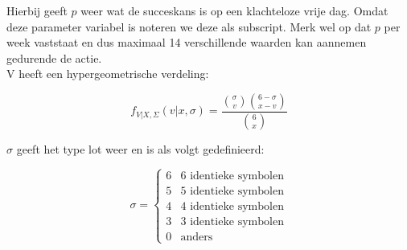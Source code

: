 Hierbij geeft $p$ weer wat de succeskans is op een klachteloze vrije dag. Omdat deze parameter variabel is noteren we deze als subscript. Merk wel op dat $p$ per week vaststaat en dus maximaal 14 verschillende waarden kan aannemen gedurende de actie.\\

V heeft een hypergeometrische verdeling:

\begin{equation}
  f_{V|X,\Sigma}(v|x,\sigma) = \frac{\binom{\sigma}{v}\binom{6 - \sigma}{x-v}}{\binom{6}{x}}
\end{equation}

$\sigma$ geeft het type lot weer en is als volgt gedefinieerd:

\begin{equation}
  \sigma =
  \begin{cases}
     6  &   6 \mbox{ identieke symbolen}\\
     5  &   5 \mbox{ identieke symbolen}\\
     4  &   4 \mbox{ identieke symbolen}\\
     3  &   3 \mbox{ identieke symbolen}\\
     0  &   \mbox{anders}
  \end{cases}
\end{equation}
